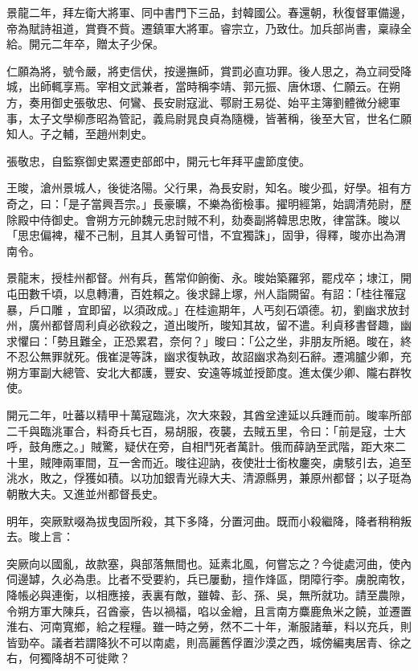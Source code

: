 \begin{pinyinscope}
 景龍二年，拜左衛大將軍、同中書門下三品，封韓國公。春還朝，秋復督軍備邊，帝為賦詩祖道，賞賚不貲。遷鎮軍大將軍。睿宗立，乃致仕。加兵部尚書，稟祿全給。開元二年卒，贈太子少保。



 仁願為將，號令嚴，將吏信伏，按邊撫師，賞罰必直功罪。後人思之，為立祠受降城，出師輒享焉。宰相文武兼者，當時稱李靖、郭元振、唐休璟、仁願云。在朔方，奏用御史張敬忠、何鸞、長安尉寇泚、鄠尉王易從、始平主簿劉體微分總軍事，太子文學柳彥昭為管記，義烏尉晁良貞為隨機，皆著稱，後至大官，世名仁願知人。子之輔，至趙州刺史。



 張敬忠，自監察御史累遷吏部郎中，開元七年拜平盧節度使。



 王晙，滄州景城人，後徙洛陽。父行果，為長安尉，知名。晙少孤，好學。祖有方奇之，曰：「是子當興吾宗。」長豪曠，不樂為銜檢事。擢明經第，始調清苑尉，歷除殿中侍御史。會朔方元帥魏元忠討賊不利，劾奏副將韓思忠敗，律當誅。晙以「思忠偏裨，權不己制，且其人勇智可惜，不宜獨誅」，固爭，得釋，晙亦出為渭南令。


景龍末，授桂州都督。州有兵，舊常仰餉衡、永。晙始築羅郛，罷戍卒；埭江，開屯田數千頃，以息轉漕，百姓賴之。後求歸上塚，州人詣闕留。有詔：「桂往罹寇暴，戶口雕
 ，宜即留，以須政成。」在桂逾期年，人丐刻石頌德。初，劉幽求放封州，廣州都督周利貞必欲殺之，道出晙所，晙知其故，留不遣。利貞移書督趣，幽求懼曰：「勢且難全，正恐累君，奈何？」晙曰：「公之坐，非朋友所絕。晙在，終不忍公無罪就死。俄崔湜等誅，幽求復執政，故詔幽求為刻石辭。遷鴻臚少卿，充朔方軍副大總管、安北大都護，豐安、安遠等城並授節度。進太僕少卿、隴右群牧使。



 開元二年，吐蕃以精甲十萬寇臨洮，次大來穀，其酋坌達延以兵踵而前。晙率所部二千與臨洮軍合，料奇兵七百，易胡服，夜襲，去賊五里，令曰：「前是寇，士大呼，鼓角應之。」賊驚，疑伏在旁，自相鬥死者萬計。俄而薛訥至武階，距大來二十里，賊陣兩軍間，互一舍而近。晙往迎訥，夜使壯士銜枚鏖突，虜駭引去，追至洮水，敗之，俘獲如積。以功加銀青光祿大夫、清源縣男，兼原州都督；以子珽為朝散大夫。又進並州都督長史。



 明年，突厥默啜為拔曳固所殺，其下多降，分置河曲。既而小殺繼降，降者稍稍叛去。晙上言：



 突厥向以國亂，故款塞，與部落無間也。延素北風，何嘗忘之？今徙處河曲，使內伺邊罅，久必為患。比者不受要約，兵已屢動，擅作烽區，閉障行李。虜脫南牧，降帳必與連衡，以相應接，表裏有敵，雖韓、彭、孫、吳，無所就功。請至農隙，令朔方軍大陳兵，召酋豪，告以禍福，啗以金繒，且言南方麋鹿魚米之饒，並遷置淮右、河南寬鄉，給之程糧。雖一時之勞，然不二十年，漸服諸華，料以充兵，則皆勁卒。議者若謂降狄不可以南處，則高麗舊俘置沙漠之西，城傍編夷居青、徐之右，何獨降胡不可徙歟？




\end{pinyinscope}
